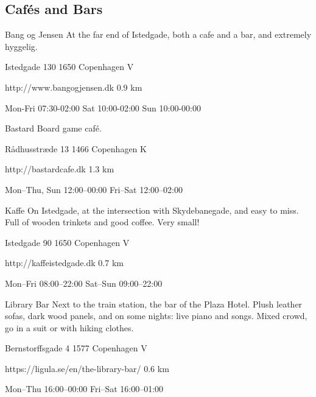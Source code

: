 \begin{left}
\begin{eventitem}
\begin{eventitem}
\begin{eventitem}
\section{Cafés and Bars}

\begin{fooditem}
{Bang og Jensen}
{At the far end of Istedgade, both a cafe and a bar, and extremely hyggelig.}
{\begin{addr}
{Istedgade 130}
{1650 Copenhagen V}
\end{addr}}
{http://www.bangogjensen.dk}
{0.9 km}
{}
{\begin{ohours}
{Mon-Fri}
{07:30-02:00}
{Sat}
{10:00-02:00}
{Sun}
{10:00-00:00}
{}
{}
\end{ohours}}
\end{fooditem}
\begin{fooditem}
{Bastard}
{Board game café.}
{\begin{addr}
{Rådhusstræde 13}
{1466 Copenhagen K}
\end{addr}}
{http://bastardcafe.dk }
{1.3 km}
{}
{\begin{ohours}
{Mon–Thu, Sun}
{12:00–00:00}
{Fri–Sat}
{12:00–02:00}
{}
{}
{}
{}
\end{ohours}}
\end{fooditem}
\begin{fooditem}
{Kaffe}
{On Istedgade, at the intersection with Skydebanegade, and easy to miss. Full of wooden trinkets and good coffee. Very small!}
{\begin{addr}
{Istedgade 90}
{1650 Copenhagen V}
\end{addr}}
{http://kaffeistedgade.dk}
{0.7 km}
{}
{\begin{ohours}
{Mon–Fri}
{08:00–22:00}
{Sat–Sun}
{09:00–22:00}
{}
{}
{}
{}
\end{ohours}}
\end{fooditem}
\begin{fooditem}
{Library Bar}
{Next to the train station, the bar of the Plaza Hotel. Plush leather sofas, dark wood panels, and on some nights: live piano and songs. Mixed crowd, go in a suit or with hiking clothes.}
{\begin{addr}
{Bernstorffsgade 4}
{1577 Copenhagen V}
\end{addr}}
{https://ligula.se/en/the-library-bar/}
{0.6 km}
{}
{\begin{ohours}
{Mon–Thu}
{16:00–00:00}
{Fri–Sat}
{16:00–01:00}
{}
{}
{}
{}
\end{ohours}}
\end{fooditem}
\begin{fooditem}

\end{fooditem}
\end{eventitem}
\end{eventitem}
\end{eventitem}
\end{left}
